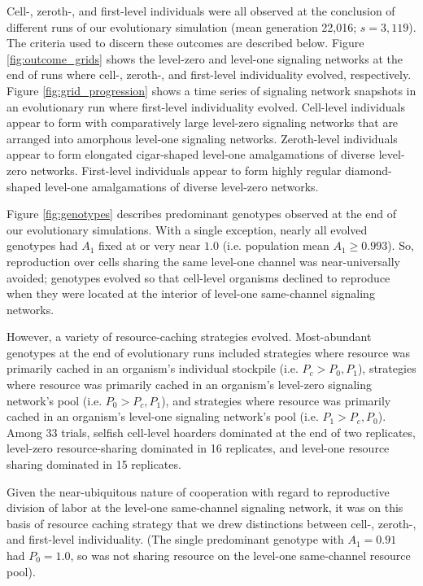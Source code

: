 Cell-, zeroth-, and first-level individuals were all observed at the conclusion of different runs of our evolutionary simulation (mean generation 22,016; $s=3,119$).
The criteria used to discern these outcomes are described below.
Figure \ref{fig:outcome_grids} shows the level-zero and level-one signaling networks at the end of runs where cell-, zeroth-, and first-level individuality evolved, respectively.
Figure \ref{fig:grid_progression} shows a time series of signaling network snapshots in an evolutionary run where first-level individuality evolved.
Cell-level individuals appear to form with comparatively large level-zero signaling networks that are arranged into amorphous level-one signaling networks.
Zeroth-level individuals appear to form elongated cigar-shaped level-one amalgamations of diverse level-zero networks.
First-level individuals appear to form highly regular diamond-shaped level-one amalgamations of diverse level-zero networks.

Figure \ref{fig:genotypes} describes predominant genotypes observed at the end of our evolutionary simulations.
With a single exception, nearly all evolved genotypes had $A_1$ fixed at or very near $1.0$ (i.e. population mean $A_1 \geq 0.993$).
So, reproduction over cells sharing the same level-one channel was near-universally avoided;
genotypes evolved so that cell-level organisms declined to reproduce when they were located at the interior of level-one same-channel signaling networks.

However, a variety of resource-caching strategies evolved.
Most-abundant genotypes at the end of evolutionary runs included strategies where resource was primarily cached in an organism's individual stockpile (i.e. $P_{c} > P_0, P_1$), strategies where resource was primarily cached in an organism's level-zero signaling network's pool (i.e. $P_0 > P_{c}, P_1$), and strategies where resource was primarily cached in an organism's level-one signaling network's pool (i.e. $P_1 > P_{c}, P_0$).
Among 33 trials, selfish cell-level hoarders dominated at the end of two replicates, level-zero resource-sharing dominated in 16 replicates, and level-one resource sharing dominated in 15 replicates.

Given the near-ubiquitous nature of cooperation with regard to reproductive division of labor at the level-one same-channel signaling network, it was on this basis of resource caching strategy that we drew distinctions between cell-, zeroth-, and first-level individuality.
(The single predominant genotype with $A_1 = 0.91$ had $P_0 = 1.0$, so was not sharing resource on the level-one same-channel resource pool).

